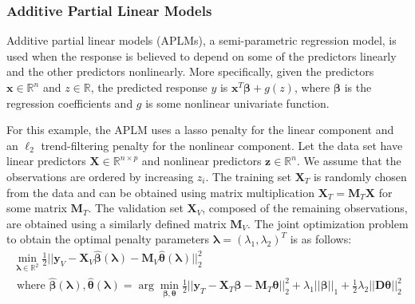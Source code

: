 \documentclass[10pt,letterpaper]{article}
\begin{document}
\subsubsection{Additive Partial Linear Models}

Additive partial linear models (APLMs), a semi-parametric regression model, is used when the response is believed to depend on some of the predictors linearly and the other predictors nonlinearly. More specifically, given the predictors $\boldsymbol x \in \mathbb{R}^{n}$ and $z \in \mathbb{R}$, the predicted response $y$ is $\boldsymbol x^T\boldsymbol \beta + g(z)$, where $\boldsymbol \beta$ is the regression coefficients and $g$ is some nonlinear univariate function.

For this example, the APLM uses a lasso penalty for the linear component and an $\ell_2$ trend-filtering penalty for the nonlinear component. Let the data set have linear predictors $\boldsymbol{X} \in \mathbb{R}^{n \times p}$ and nonlinear predictors $\boldsymbol{z} \in \mathbb{R}^n$. We assume that the observations are ordered by increasing $z_i$. The training set $\boldsymbol{X}_T$ is randomly chosen from the data and can be obtained using matrix multiplication $ \boldsymbol{X}_T = \boldsymbol{M}_T \boldsymbol{X}$ for some matrix $\boldsymbol{M}_T$. The validation set $\boldsymbol{X}_V$, composed of the remaining observations, are obtained using a similarly defined matrix $\boldsymbol{M}_V$.
The joint optimization problem to obtain the optimal penalty parameters $\boldsymbol\lambda = (\lambda_1, \lambda_2)^T$ is as follows:
\begin{equation}
\begin{array}{c}
\min_{\boldsymbol\lambda \in \mathbb{R}^2} \frac{1}{2}
\bigl\lvert\bigl\lvert
\boldsymbol{y}_V
- \boldsymbol{X}_V\hat{\boldsymbol{\beta}}(\boldsymbol{\lambda})
- \boldsymbol{M}_V \hat{\boldsymbol{\theta}}(\boldsymbol{\lambda})
\bigl\rvert\bigl\rvert^2_2 \\
\text{ where } \hat{\boldsymbol{\beta}}(\boldsymbol{\lambda}),
\hat{\boldsymbol{\theta}}(\boldsymbol{\lambda}) =
\arg\min_{\boldsymbol{\beta}, \boldsymbol{\theta}}
\frac{1}{2} \bigl\lvert\bigl\lvert
\boldsymbol{y}_T
- \boldsymbol{X}_T\boldsymbol{\beta}
- \boldsymbol{M}_T \boldsymbol{\theta} \bigl\rvert\bigl\rvert^2_2
+ \lambda_1 \lvert\lvert \boldsymbol{\beta}
\rvert \rvert_1
+ \frac{1}{2} \lambda_2 \lvert\lvert \boldsymbol{D} \boldsymbol{\theta} \rvert \rvert_2^2
\end{array}
\end{equation}
\end{document}
